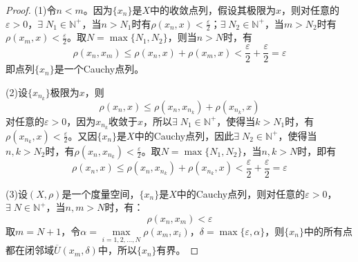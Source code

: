 \begin{proof}
	(1)令$n<m$。因为$\{x_n\}$是$X$中的收敛点列，假设其极限为$x$，则对任意的$\varepsilon>0$，$\exists\; N_1\in\mathbb{N}^+$，当$n>N_1$时有$\rho(x_n,x)<\frac{\varepsilon}{2}$；$\exists\; N_2\in\mathbb{N}^+$，当$m>N_2$时有$\rho(x_m,x)<\frac{\varepsilon}{2}$。取$N=\max\{N_1,N_2\}$，则当$n>N$时，有
	\begin{equation*}
		\rho(x_n,x_m)\leqslant\rho(x_n,x)+\rho(x_m,x)<\frac{\varepsilon}{2}+\frac{\varepsilon}{2}=\varepsilon
	\end{equation*}
	即点列$\{x_n\}$是一个Cauchy点列。\par
	(2)设$\{x_{n_k}\}$极限为$x$，则
	\begin{equation*}
		\rho(x_n,x)\leqslant\rho(x_n,x_{n_k})+\rho(x_{n_k},x)
	\end{equation*}
	对任意的$\varepsilon>0$，因为$x_{n_k}$收敛于$x$，所以$\exists\;N_1\in\mathbb{N}^+$，使得当$k>N_1$时，有$\rho(x_{n_k},x)<\frac{\varepsilon}{2}$。又因$\{x_n\}$是$X$中的Cauchy点列，因此$\exists\;N_2\in\mathbb{N}^+$，使得当$n,k>N_2$时，有$\rho(x_n,x_{n_k})<\frac{\varepsilon}{2}$。取$N=\max\{N_1,N_2\}$，当$n,k>N$时，即有
	\begin{equation*}
		\rho(x_n,x)\leqslant\rho(x_n,x_{n_k})+\rho(x_{n_k},x)<\frac{\varepsilon}{2}+\frac{\varepsilon}{2}=\varepsilon
	\end{equation*}\par
	(3)设$(X,\rho)$是一个度量空间，$\{x_n\}$是$X$中的Cauchy点列，则对任意的$\varepsilon>0$，$\exists\;N\in\mathbb{N}^+$，当$n,m>N$时，有：
	\begin{equation*}
		\rho(x_n,x_m)<\varepsilon
	\end{equation*}
	取$m=N+1$，令$\alpha=\max\limits_{i=1,2,\dots,N}\rho(x_m,x_i)$，$\delta=\max\{\varepsilon,\alpha\}$，则$\{x_n\}$中的所有点都在闭邻域$\overline{U}(x_m,\delta)$中，所以$\{x_n\}$有界。
\end{proof}
